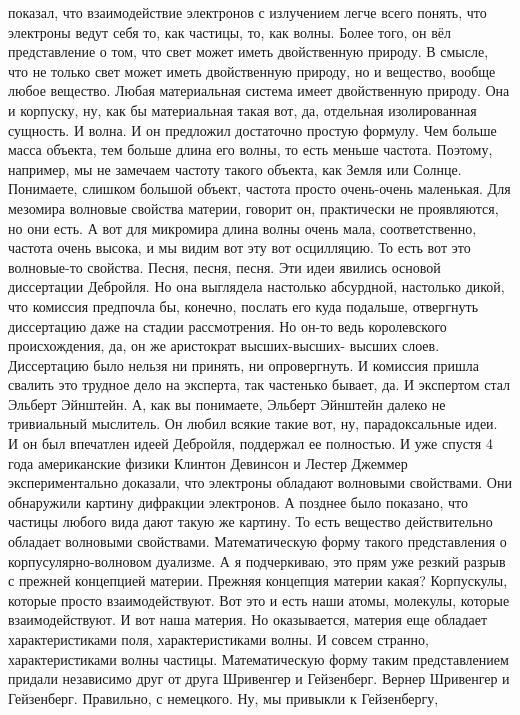 показал, что взаимодействие электронов с излучением легче всего понять, что
электроны ведут себя то, как частицы, то, как волны. Более того, он вёл
представление о том, что свет может иметь двойственную природу. В смысле, что не
только свет может иметь двойственную природу, но и вещество, вообще любое
вещество. Любая материальная система имеет двойственную природу. Она и корпуску,
ну, как бы материальная такая вот, да, отдельная изолированная сущность. И
волна. И он предложил достаточно простую формулу. Чем больше масса объекта, тем
больше длина его волны, то есть меньше частота. Поэтому, например, мы не
замечаем частоту такого объекта, как Земля или Солнце. Понимаете, слишком
большой объект, частота просто очень-очень маленькая. Для мезомира волновые
свойства материи, говорит он, практически не проявляются, но они есть. А вот для
микромира длина волны очень мала, соответственно, частота очень высока, и мы
видим вот эту вот осцилляцию. То есть вот это волновые-то свойства. Песня,
песня, песня. Эти идеи явились основой диссертации Дебройля. Но она выглядела
настолько абсурдной, настолько дикой, что комиссия предпочла бы, конечно,
послать его куда подальше, отвергнуть диссертацию даже на стадии рассмотрения.
Но он-то ведь королевского происхождения, да, он же аристократ высших-высших-
высших слоев. Диссертацию было нельзя ни принять, ни опровергнуть. И комиссия
пришла свалить это трудное дело на эксперта, так частенько бывает, да. И
экспертом стал Эльберт Эйнштейн. А, как вы понимаете, Эльберт Эйнштейн далеко не
тривиальный мыслитель. Он любил всякие такие вот, ну, парадоксальные идеи. И он
был впечатлен идеей Дебройля, поддержал ее полностью. И уже спустя 4 года
американские физики Клинтон Девинсон и Лестер Джеммер экспериментально доказали,
что электроны обладают волновыми свойствами. Они обнаружили картину дифракции
электронов. А позднее было показано, что частицы любого вида дают такую же
картину. То есть вещество действительно обладает волновыми свойствами.
Математическую форму такого представления о корпусулярно-волновом дуализме. А я
подчеркиваю, это прям уже резкий разрыв с прежней концепцией материи. Прежняя
концепция материи какая? Корпускулы, которые просто взаимодействуют. Вот это и
есть наши атомы, молекулы, которые взаимодействуют. И вот наша материя. Но
оказывается, материя еще обладает характеристиками поля, характеристиками волны.
И совсем странно, характеристиками волны частицы. Математическую форму таким
представлением придали независимо друг от друга Шривенгер и Гейзенберг. Вернер
Шривенгер и Гейзенберг. Правильно, с немецкого. Ну, мы привыкли к Гейзенбергу,
